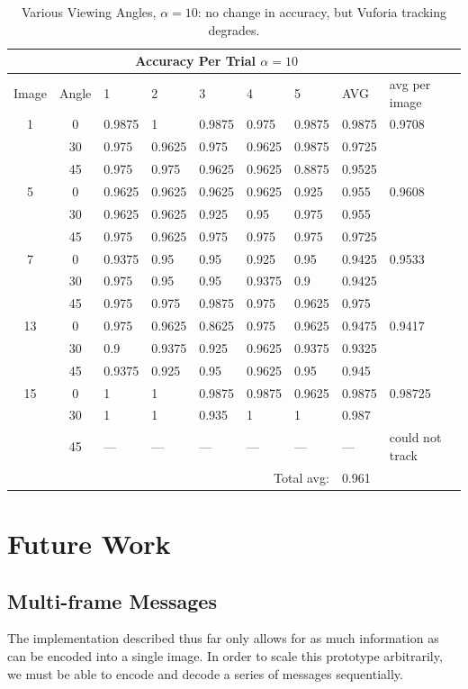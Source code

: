 \documentclass[11pt, letterpaper]{article}
\begin{document}
\begin{table}[t]
\label{tab:angles}
\caption{Various Viewing Angles, $\alpha=10$: no change in accuracy, but Vuforia tracking degrades.}
\centering
\begin{tabular}{c c | l l l l l l l}
\\
&& \multicolumn{5}{c}{Accuracy Per Trial $\alpha=10$}&&\\
\toprule
Image&Angle&1&2&3&4&5&AVG&avg per image\\
\midrule
1&0&0.9875&1&0.9875&0.975&0.9875&0.9875&0.9708\\
&30&0.975&0.9625&0.975&0.9625&0.9875&0.9725&\\
&45&0.975&0.975&0.9625&0.9625&0.8875&0.9525&\\
5&0&0.9625&0.9625&0.9625&0.9625&0.925&0.955&0.9608\\
&30&0.9625&0.9625&0.925&0.95&0.975&0.955&\\
&45&0.975&0.9625&0.975&0.975&0.975&0.9725&\\
7&0&0.9375&0.95&0.95&0.925&0.95&0.9425&0.9533\\
&30&0.975&0.95&0.95&0.9375&0.9&0.9425&\\
&45&0.975&0.975&0.9875&0.975&0.9625&0.975&\\
13&0&0.975&0.9625&0.8625&0.975&0.9625&0.9475&0.9417\\
&30&0.9&0.9375&0.925&0.9625&0.9375&0.9325&\\
&45&0.9375&0.925&0.95&0.9625&0.95&0.945&\\
15&0&1&1&0.9875&0.9875&0.9625&0.9875&0.98725\\
&30&1&1&0.935&1&1&0.987&\\
&45&---&---&---&---&---&---&could not track\\ 
\bottomrule
&&&&&\multicolumn{2}{r}{Total avg:}&0.961&\\
\end{tabular}
\end{table}

\section{Future Work}

\subsection{Multi-frame Messages}
The implementation described thus far only allows for as much information as can be encoded into a single image.
In order to scale this prototype arbitrarily, we must be able to encode and decode a series of messages sequentially.
\end{document}
